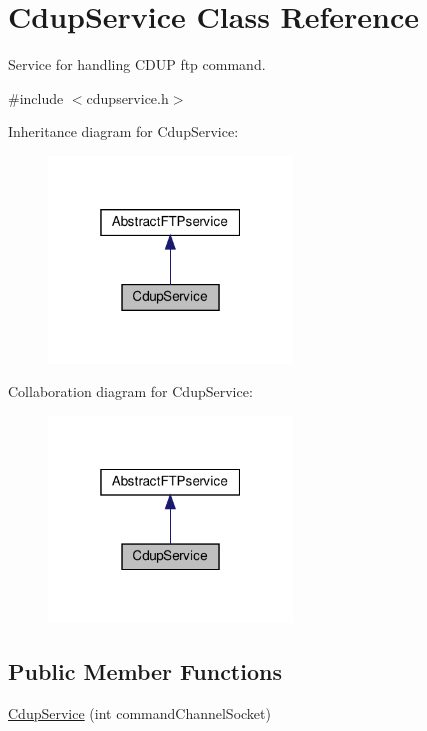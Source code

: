 \hypertarget{classCdupService}{}\section{Cdup\+Service Class Reference}
\label{classCdupService}


Service for handling C\+D\+UP ftp command.  




{\ttfamily \#include $<$cdupservice.\+h$>$}



Inheritance diagram for Cdup\+Service\+:\nopagebreak
\begin{figure}[H]
\begin{center}
\leavevmode
\includegraphics[width=184pt]{d3/d34/classCdupService__inherit__graph}
\end{center}
\end{figure}


Collaboration diagram for Cdup\+Service\+:\nopagebreak
\begin{figure}[H]
\begin{center}
\leavevmode
\includegraphics[width=184pt]{d6/d7f/classCdupService__coll__graph}
\end{center}
\end{figure}
\subsection*{Public Member Functions}
\begin{DoxyCompactItemize}
\item 
\hyperlink{classCdupService_ae8c9f05507b10e66af7f73a8cdf3236b}{Cdup\+Service} (int command\+Channel\+Socket)
\end{DoxyCompactItemize}
